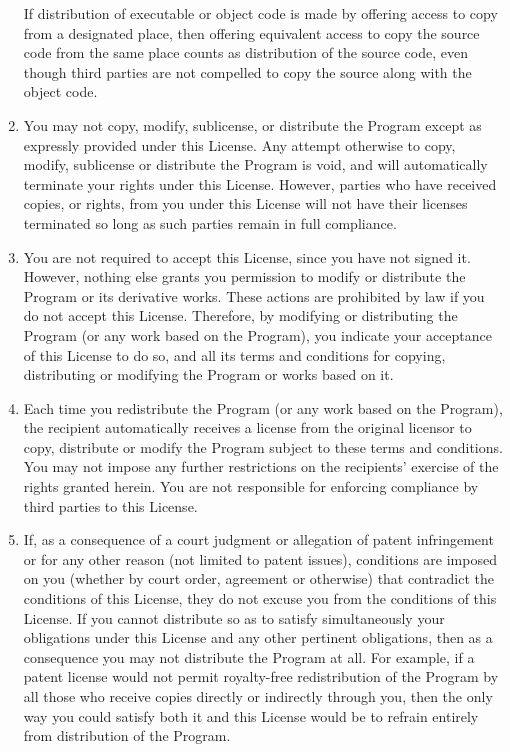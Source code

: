 \begin{lrbox}{\gpl}
\begin{minipage}{3\textwidth}
\begin{multicols}{3}
\begin{enumerate}
If distribution of executable or object code is made by offering
access to copy from a designated place, then offering equivalent
access to copy the source code from the same place counts as
distribution of the source code, even though third parties are not
compelled to copy the source along with the object code.

\item
You may not copy, modify, sublicense, or distribute the Program
except as expressly provided under this License.  Any attempt
otherwise to copy, modify, sublicense or distribute the Program is
void, and will automatically terminate your rights under this License.
However, parties who have received copies, or rights, from you under
this License will not have their licenses terminated so long as such
parties remain in full compliance.

\item
You are not required to accept this License, since you have not
signed it.  However, nothing else grants you permission to modify or
distribute the Program or its derivative works.  These actions are
prohibited by law if you do not accept this License.  Therefore, by
modifying or distributing the Program (or any work based on the
Program), you indicate your acceptance of this License to do so, and
all its terms and conditions for copying, distributing or modifying
the Program or works based on it.

\item
Each time you redistribute the Program (or any work based on the
Program), the recipient automatically receives a license from the
original licensor to copy, distribute or modify the Program subject to
these terms and conditions.  You may not impose any further
restrictions on the recipients' exercise of the rights granted herein.
You are not responsible for enforcing compliance by third parties to
this License.

\item
If, as a consequence of a court judgment or allegation of patent
infringement or for any other reason (not limited to patent issues),
conditions are imposed on you (whether by court order, agreement or
otherwise) that contradict the conditions of this License, they do not
excuse you from the conditions of this License.  If you cannot
distribute so as to satisfy simultaneously your obligations under this
License and any other pertinent obligations, then as a consequence you
may not distribute the Program at all.  For example, if a patent
license would not permit royalty-free redistribution of the Program by
all those who receive copies directly or indirectly through you, then
the only way you could satisfy both it and this License would be to
refrain entirely from distribution of the Program.


\end{enumerate}
\end{multicols}
\end{minipage}
\end{lrbox}
